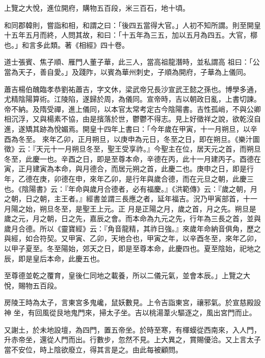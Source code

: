 \begin{pinyinscope}
 上覽之大悅，進位開府，購物五百段，米三百石，地十頃。



 和同郡韓則，嘗詣和相，和謂之曰：「後四五當得大官。」人初不知所謂。則至開皇十五年五月而終，人問其故，和曰：「十五年為三五，加以五月為四五。大官，槨也。」和言多此類。著《相經》四十卷。



 道士張賓、焦子順、雁門人董子華，此三人，當高祖龍潛時，並私謂高
 祖曰：「公當為天子，善自愛。」及踐阼，以賓為華州刺史，子順為開府，子華為上儀同。



 蕭吉楊伯醜臨孝恭劉祐蕭吉，字文休，梁武帝兄長沙宣武王懿之孫也。博學多通，尤精陰陽算術。江陵陷，遂歸於周，為儀同。宣帝時，吉以朝政日亂，上書切諫。帝不納。及隋受禪，進上儀同，以本官太常考定古今陰陽書。吉性孤峭，不與公卿相沉浮，又與楊素不協，由是擯落於世，鬱鬱不得志。見上好徵祥之說，欲乾沒自進，遂矯其跡為悅媚焉。開皇十四年上書曰：「今年歲在甲寅，十一月朔旦，以辛酉為冬至。
 來年乙卯，正月朔旦，以庚申為元日，冬至之日，即在朔旦。《樂汁圖徵》云：『天元十一月朔旦冬至，聖王受享祚。』今聖主在位，居天元之首，而朔旦冬至，此慶一也。辛酉之日，即是至尊本命，辛德在丙，此十一月建丙子。酉德在寅，正月建寅為本命，與月德合，而居元朔之首，此慶二也。庚申之日，即是行年，乙德在庚，卯德在申，來年乙卯，是行年與歲合德，而在元旦之朝，此慶三也。《陰陽書》云：『年命與歲月合德者，必有福慶。』《洪範傳》云：『歲之朝，月之朝，日之朝，主王者。』經書並謂三長應之者，延年福吉。況乃甲寅部首，十一月陽之始，朔旦冬至，是聖王上元。正
 月是正陽之月，歲之首，月之先。朔旦是歲之元，月之朝，日之先，嘉辰之會。而本命為九元之先，行年為三長之首，並與歲月合德。所以《靈寶經》云：『角音龍精，其祚日強。』來歲年命納音俱角，歷之與經，如合符契。又甲寅、乙卯，天地合也，甲寅之年，以辛酉冬至，來年乙卯，以甲子夏至。冬至陽始，郊天之日，即是至尊本命，此慶四也。夏至陰始，祀地之辰，即是皇后本命，此慶五也。



 至尊德並乾之覆育，皇後仁同地之載養，所以二儀元氣，並會本辰。」上覽之大悅，賜物五百段。



 房陵王時為太子，言東宮多鬼巉，鼠妖數見。上令吉詣東宮，禳邪氣。於宣慈殿設神
 坐，有回風從艮地鬼門來，掃太子坐。吉以桃湯葦火驅逐之，風出宮門而止。



 又謝土，於未地設壇，為四門，置五帝坐。於時至寒，有楎蟆從西南來，入人門，升赤帝坐，還從人門而出。行數步，忽然不見。上大異之，賞賜優洽。又上言太子當不安位，時上陰欲廢立，得其言是之。由此每被顧問。




\end{pinyinscope}
